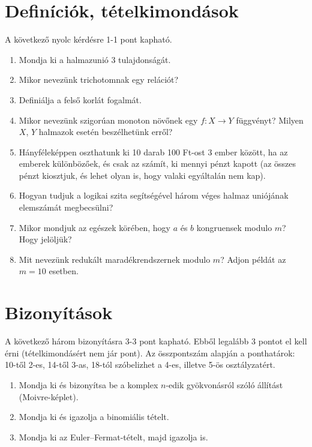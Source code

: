 \documentclass[11pt,a4paper]{article}
\begin{document}
\section{Definíciók, tételkimondások}
A következő nyolc kérdésre 1-1 pont kapható. 
\begin{enumerate}\setlength{\itemsep}{4.2cm}

\item Mondja ki a halmazunió 3 tulajdonságát.
\item Mikor nevezünk trichotomnak egy relációt?
\item Definiálja a felső korlát fogalmát.
\item Mikor nevezünk szigorúan monoton növőnek egy $f:X\to Y$ függvényt? Milyen $X$, $Y$ halmazok esetén beszélhetünk erről?

\newpage
\item Hányféleképpen oszthatunk ki 10 darab 100 Ft-ost 3 ember között, ha az emberek különbözőek, és csak az számít, ki mennyi pénzt kapott (az összes pénzt kiosztjuk, és lehet olyan is, hogy valaki egyáltalán nem kap).
\item Hogyan tudjuk a logikai szita segítségével három véges halmaz uniójának elemszámát megbecsülni?
\item Mikor mondjuk az egészek körében, hogy $a$ és $b$ kongruensek modulo $m$? Hogy jelöljük? 
\item Mit nevezünk redukált maradékrendszernek modulo $m$? Adjon példát az $m=10$ esetben.



\end{enumerate}

\newpage
\section{Bizonyítások}
A következő három bizonyításra 3-3 pont kapható. Ebből legalább 3 pontot el kell érni (tételkimondásért nem jár pont).
Az összpontszám alapján a ponthatárok: 10-től 2-es, 14-től 3-as, 18-tól szóbelizhet a 4-es, illetve 5-ös osztályzatért.
\begin{enumerate}

\item Mondja ki és bizonyítsa be a komplex $n$-edik gyökvonásról szóló állítást (Moivre-képlet).
\item Mondja ki és igazolja a binomiális tételt.
\item Mondja ki az Euler--Fermat-tételt, majd igazolja is.

\end{enumerate}
\end{document}
